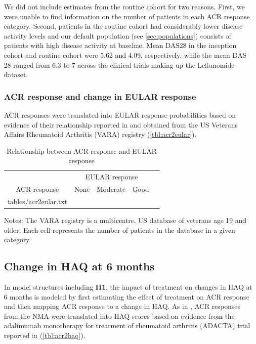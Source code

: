 \documentclass[11pt,final,fleqn]{article}\usepackage[]{graphicx}\usepackage[]{color}
\makeatletter
\theoremstyle{plain}
\newcommand*\ExpandableInput[1]{\@@input#1 }
\makeatother
\begin{document}
We did not include estimates from the routine cohort for two reasons. First, we were unable to find information on the number of patients in each ACR response category. Second, patients in the routine cohort had considerably lower disease activity levels \citep{aletaha2005simplified, aletaha2005acute} and our default population (see \autoref{sec:populations}) consists of patients with high disease activity at baseline. Mean DAS28 in the inception cohort and routine cohort were 5.62 and 4.09, respectively, while the mean DAS 28 ranged from 6.3 to 7 across the clinical trials making up the Leflunomide dataset.

\subsubsection{ACR response and change in EULAR response}
ACR responses were translated into EULAR response probabilities based on evidence of their relationship reported in \citet{stevenson2016adalimumab} and obtained from the US Veterans Affairs Rheumatoid Arthritis (VARA) registry (\autoref{tbl:acr2eular}).




\begin{table}[!ht]
\begin{center}
\begin{threeparttable}
\caption{Relationship between ACR response and EULAR response} \label{tbl:acr2eular}
\begin{tabularx}{\textwidth}{@{\extracolsep{\fill}}lcccc}
\hline
\multicolumn{1}{l}{} & \multicolumn{3}{c}{EULAR response} \\
\cmidrule{2-4} 
\multicolumn{1}{c}{ACR response} & \multicolumn{1}{c}{None} & \multicolumn{1}{c}{Moderate} & \multicolumn{1}{c}{Good} \\
\hline
\ExpandableInput{tables/acr2eular.txt}
\hline
\end{tabularx}
\scriptsize
Notes: The VARA registry is a multicentre, US database of veterans age 19 and older. Each cell represents the number of patients in the 
database in a given category. 
\end{threeparttable}
\end{center}
\end{table}

\subsection{Change in HAQ at 6 months}
In model structures including \textbf{H1}, the impact of treatment on changes in HAQ at 6 months is modeled by first estimating the effect of treatment on ACR response and then mapping ACR response to a change in HAQ. As in \citet{icer2017tim}, ACR responses from the NMA were translated into HAQ scores based on evidence from the adalimumab monotherapy for treatment of rheumatoid arthritis (ADACTA) trial reported in \citet{carlson2015economic} (\autoref{tbl:acr2haq}).
\end{document}
